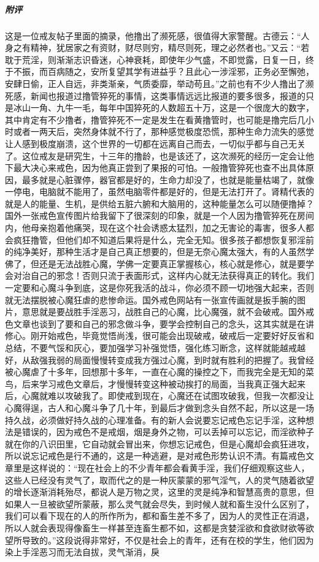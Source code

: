 \begin{case}
    \subparagraph{附评} 这是一位戒友帖子里面的摘录，他撸出了濒死感，很值得大家警醒。古德云：“人身之有精神，犹居家之有资财，财尽则穷，精尽则死，理之必然者也。”又云：“若耽于荒淫，则渐渐志识昏迷，心神衰耗，即使年少气盛，不即觉露，日复一日，终于不振，而百病随之，安所复望其学有进益乎？且此心一涉淫邪，正务必至懈弛，安肆日偷，正人自远，非类渐亲，气质委靡，举动苟且。”之前也有不少人撸出了濒死感，新闻也报道过撸管猝死的事情，这类事情远远比报道的要多很多，报道的只是冰山一角、九牛一毛，每年中国猝死的人数超五十万，这是一个很庞大的数字，其中肯定有不少撸者，撸管猝死不一定是发生在看黄撸管时，也可能是撸完后几小时或者一两天后，突然身体就不行了，那种感觉极度恐慌，那种生命力流失的感觉让人感到极度崩溃，这个世界的一切都在远离自己而去，一切似乎都与自己无关了。这位戒友是研究生，十三年的撸龄，也是该还了，这次濒死的经历一定会让他下最大决心来戒色，因为他真正尝到了果报的可怕。一般撸管猝死也查不出具体原因，最多就是心脏骤停，器官都是好的，生命力却没了，也就是能量枯竭了，就像一停电，电脑就不能用了，虽然电脑零件都是好的，但是无法打开了。肾精代表的就是人的能量、生机，是供给五脏六腑和大脑用的，这种能量怎么可以随便撸掉？国外一张戒色宣传图片给我留下了很深刻的印象，就是一个人因为撸管猝死在房间内，他母亲抱着他痛哭，现在这个社会诱惑太猛烈，加之无害论的毒害，很多人都会疯狂撸管，但他们却不知道后果将是什么，完全无知。很多孩子都想恢复邪淫前的纯净美好，那种生活才是自己真正想要的，但是无奈心魔太强大，有的人虽然学佛了，但还是无法战胜心魔，学佛一定要真正掌握核心，核心就是修心，就是要学会对治自己的邪念！否则只流于表面形式，这样内心就无法获得真正的转化。我们一定要和心魔斗争到底，这是你死我活的战斗，你必须不顾一切地强大起来，否则就无法摆脱被心魔狂虐的悲惨命运。国外戒色网站有一张宣传画就是扳手腕的图片，意思就是要战胜手淫恶习，战胜自己的心魔，比心魔强，就不会破戒。国外戒色文章也谈到了要和自己的邪念做斗争，要学会控制自己的念头，这其实就是在讲修心。刚开始戒色，毕竟觉悟尚浅，很可能会出现破戒，破戒后一定要好好反省和总结，不要气馁和灰心，要加强学习补强觉悟，强化练习断念，这样就能越戒越好，从敌强我弱的局面慢慢转变成我方强过心魔，到时就有胜利的把握了。我曾经被心魔虐了十多年，回想那十多年，一直在心魔的操控之下，而我完全是无知的菜鸟，后来学习戒色文章后，才慢慢转变这种被动挨打的局面，当我真正强大起来后，心魔就难以攻破我了。即使戒到现在，心魔还在试图攻破我，但我一次都没让心魔得逞，古人和心魔斗争了几十年，到最后才做到念头自然不起，所以这是一场持久战，必须做好持久战的心理准备。有的新人会说要忘记戒色忘记手淫，这种想法是错误的，因为戒色不是戒烟，烟是身外之物，可以丢掉可以忘记，而淫欲种子就在你的八识田里，它自动就会冒出来，你想忘记戒色，但是心魔却会疯狂进攻，所以说忘记戒色是行不通的，这是一种逃避，是对戒色形势认识不清。有篇戒色文章里是这样说的：“现在社会上的不少青年都会看黄手淫，我们仔细观察这些人，这些人已经没有灵气了，取而代之的是一种灰蒙蒙的邪气淫气，人的灵气随着欲望的增长逐渐消耗殆尽，都说人是万物之灵，这里的灵是纯净和智慧高贵的意思，但如果人一旦被欲望所蒙蔽，那么灵气就会尽失，到时候人就和畜生没什么区别了，我们可以看下现在的人的所作所为，都和畜生差不多了，因为人的灵性正在消退，所以人就会表现得像畜生一样甚至连畜生都不如，这都是贪婪淫欲和食欲财欲等欲望所导致的。”这段说得非常好，不仅是社会上的青年，还有在校的学生，他们因为染上手淫恶习而无法自拔，灵气渐消，戾
\end{case}
